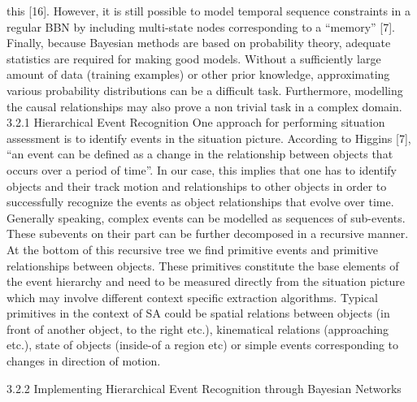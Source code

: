 \documentclass[a4paper,11pt,twoside]{StyleThese}
\begin{document}
this [16]. However, it is still possible to model temporal sequence constraints in a regular
BBN by including multi-state nodes corresponding to a “memory” [7].
Finally, because Bayesian methods are based on probability theory, adequate statistics are
required for making good models. Without a sufficiently large amount of data (training
examples) or other prior knowledge, approximating various probability distributions can be a
difficult task. Furthermore, modelling the causal relationships may also prove a non trivial
task in a complex domain.
3.2.1 Hierarchical Event Recognition
One approach for performing situation assessment is to identify events in the situation
picture. According to Higgins [7], “an event can be defined as a change in the relationship
between objects that occurs over a period of time”. In our case, this implies that one has to
identify objects and their track motion and relationships to other objects in order to
successfully recognize the events as object relationships that evolve over time.
Generally speaking, complex events can be modelled as sequences of sub-events. These subevents
on their part can be further decomposed in a recursive manner. At the bottom of this 
recursive tree we find primitive events and primitive relationships between objects. These
primitives constitute the base elements of the event hierarchy and need to be measured
directly from the situation picture which may involve different context specific extraction
algorithms. Typical primitives in the context of SA could be spatial relations between objects
(in front of another object, to the right etc.), kinematical relations (approaching etc.), state of
objects (inside-of a region etc) or simple events corresponding to changes in direction of
motion.


3.2.2 Implementing Hierarchical Event Recognition through Bayesian
Networks
\end{document}
